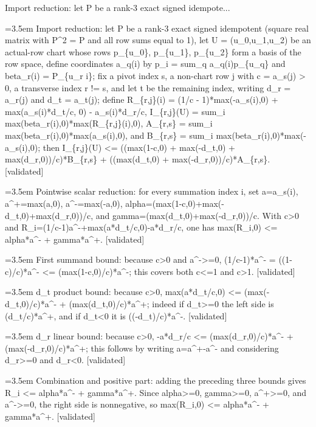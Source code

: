 \documentclass{article}
\newcommand{\step}[1]{\par\noindent\hangindent=3.5em\hangafter=1%
  \makebox[3.5em][l]{\textbf{#1.}}}
\newcommand{\steptag}[1]{\hfill{\small\textsf{[#1]}}}
\begin{document}
\begin{proofbox}{Import reduction: let P be a rank-3 exact signed idempote...}
\step{1} Import reduction: let P be a rank-3 exact signed idempotent (square real matrix with P\textasciicircum{}2 = P and all row sums equal to 1), let U = (u\_0,u\_1,u\_2) be an actual-row chart whose rows p\_\{u\_0\}, p\_\{u\_1\}, p\_\{u\_2\} form a basis of the row space, define coordinates a\_q(i) by p\_i = sum\_q a\_q(i)p\_\{u\_q\} and beta\_r(i) = P\_\{u\_r i\}; fix a pivot index s, a non-chart row j with c = a\_s(j) > 0, a transverse index r != s, and let t be the remaining index, writing d\_r = a\_r(j) and d\_t = a\_t(j); define R\_\{r,j\}(i) = (1/c - 1)*max(-a\_s(i),0) + max(a\_s(i)*d\_t/c, 0) - a\_s(i)*d\_r/c, I\_\{r,j\}(U) = sum\_i max(beta\_r(i),0)*max(R\_\{r,j\}(i),0), A\_\{r,s\} = sum\_i max(beta\_r(i),0)*max(a\_s(i),0), and B\_\{r,s\} = sum\_i max(beta\_r(i),0)*max(-a\_s(i),0); then I\_\{r,j\}(U) <= ((max(1-c,0) + max(-d\_t,0) + max(d\_r,0))/c)*B\_\{r,s\} + ((max(d\_t,0) + max(-d\_r,0))/c)*A\_\{r,s\}. \steptag{validated} \\[6pt]
\step{1.1} Pointwise scalar reduction: for every summation index i, set a=a\_s(i), a\textasciicircum{}+=max(a,0), a\textasciicircum{}-=max(-a,0), alpha=(max(1-c,0)+max(-d\_t,0)+max(d\_r,0))/c, and gamma=(max(d\_t,0)+max(-d\_r,0))/c. With c>0 and R\_i=(1/c-1)a\textasciicircum{}-+max(a*d\_t/c,0)-a*d\_r/c, one has max(R\_i,0) <= alpha*a\textasciicircum{}- + gamma*a\textasciicircum{}+. \steptag{validated} \\[6pt]
\step{1.1.1} First summand bound: because c>0 and a\textasciicircum{}->=0, (1/c-1)*a\textasciicircum{}- = ((1-c)/c)*a\textasciicircum{}- <= (max(1-c,0)/c)*a\textasciicircum{}-; this covers both c<=1 and c>1. \steptag{validated} \\[4pt]
\step{1.1.2} d\_t product bound: because c>0, max(a*d\_t/c,0) <= (max(-d\_t,0)/c)*a\textasciicircum{}- + (max(d\_t,0)/c)*a\textasciicircum{}+; indeed if d\_t>=0 the left side is (d\_t/c)*a\textasciicircum{}+, and if d\_t<0 it is ((-d\_t)/c)*a\textasciicircum{}-. \steptag{validated} \\[4pt]
\step{1.1.3} d\_r linear bound: because c>0, -a*d\_r/c <= (max(d\_r,0)/c)*a\textasciicircum{}- + (max(-d\_r,0)/c)*a\textasciicircum{}+; this follows by writing a=a\textasciicircum{}+-a\textasciicircum{}- and considering d\_r>=0 and d\_r<0. \steptag{validated} \\[4pt]
\step{1.1.4} Combination and positive part: adding the preceding three bounds gives R\_i <= alpha*a\textasciicircum{}- + gamma*a\textasciicircum{}+. Since alpha>=0, gamma>=0, a\textasciicircum{}+>=0, and a\textasciicircum{}->=0, the right side is nonnegative, so max(R\_i,0) <= alpha*a\textasciicircum{}- + gamma*a\textasciicircum{}+. \steptag{validated} \\[4pt]

\end{proofbox}
\end{document}
